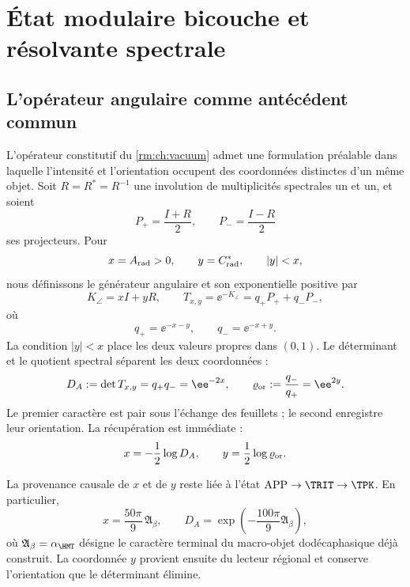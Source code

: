 \chapter{État modulaire bicouche et résolvante spectrale}
\label{rm:chap:estado-modular-resolvente}

\section{L’opérateur angulaire comme antécédent commun}

L’opérateur constitutif du \cref{rm:ch:vacuum} admet une formulation préalable dans laquelle l’intensité et l’orientation occupent des coordonnées distinctes d’un même objet. Soit \(R=R^*=R^{-1}\) une involution de multiplicités spectrales un et un, et soient
\begin{equation}
 P_+=\frac{I+R}{2},
 \qquad
 P_-=\frac{I-R}{2}
 \label{rm:eq:modular-projectors}
\end{equation}
ses projecteurs. Pour
\begin{equation}
 x=A_{\rm rad}>0,
 \qquad
 y=C^*_{\rm rad},
 \qquad
 |y|<x,
 \label{rm:eq:modular-domain}
\end{equation}
nous définissons le générateur angulaire et son exponentielle positive par
\begin{equation}
 K_{\angle}=xI+yR,
 \qquad
 T_{x,y}=\ee^{-K_{\angle}}
 =q_+P_++q_-P_-,
 \label{rm:eq:modular-angular-operator}
\end{equation}
où
\begin{equation}
 q_+=\ee^{-x-y},
 \qquad
 q_-=\ee^{-x+y}.
 \label{rm:eq:modular-qpm}
\end{equation}
La condition \(|y|<x\) place les deux valeurs propres dans \((0,1)\). Le déterminant et le quotient spectral séparent les deux coordonnées :
\begin{equation}
 D_A:=\det T_{x,y}=q_+q_-=\ee^{-2x},
 \qquad
 \varrho_{\rm or}:=\frac{q_-}{q_+}=\ee^{2y}.
 \label{rm:eq:modular-determinant-ratio}
\end{equation}
Le premier caractère est pair sous l’échange des feuillets ; le second enregistre leur orientation. La récupération est immédiate :
\begin{equation}
 x=-\frac12\log D_A,
 \qquad
 y=\frac12\log\varrho_{\rm or}.
 \label{rm:eq:modular-recover-xy}
\end{equation}

La provenance causale de \(x\) et de \(y\) reste liée à l’état \(\mathrm{APP}\to\TRIT\to\TPK\). En particulier,
\begin{equation}
 x=\frac{50\pi}{9}\,\mathfrak A_\beta,
 \qquad
 D_A=\exp\!\left(-\frac{100\pi}{9}\mathfrak A_\beta\right),
 \label{rm:eq:modular-alpha-determinant}
\end{equation}
où \(\mathfrak A_\beta=\alpha_{\HMT}\) désigne le caractère terminal du macro-objet dodécaphasique déjà construit. La coordonnée \(y\) provient ensuite du lecteur régional et conserve l’orientation que le déterminant élimine.

